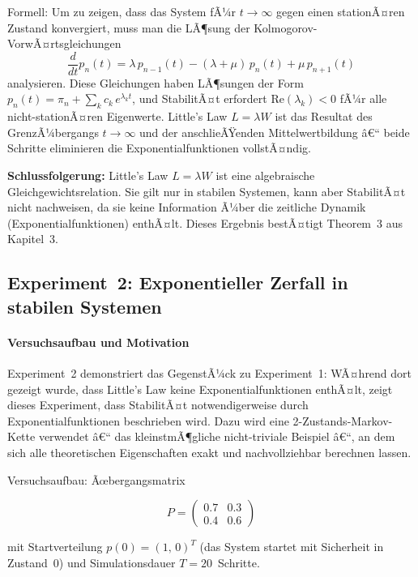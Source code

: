 ﻿\documentclass[a4paper,12pt]{report}
\theoremstyle{definition}
\begin{document}
Formell: Um zu zeigen, dass das System fÃ¼r $t \to \infty$ gegen einen
stationÃ¤ren Zustand konvergiert, muss man die LÃ¶sung der
Kolmogorov-VorwÃ¤rtsgleichungen
\[
\frac{d}{dt}p_n(t) = \lambda\, p_{n-1}(t) - (\lambda+\mu)\,p_n(t)
+ \mu\, p_{n+1}(t)
\]
analysieren.  Diese Gleichungen haben LÃ¶sungen der Form
$p_n(t) = \pi_n + \sum_k c_k\, e^{\lambda_k t}$, und StabilitÃ¤t
erfordert $\text{Re}(\lambda_k) < 0$ fÃ¼r alle nicht-stationÃ¤ren
Eigenwerte.  Little's Law $L = \lambda W$ ist das Resultat des
GrenzÃ¼bergangs $t \to \infty$ und der anschlieÃŸenden
Mittelwertbildung â€“ beide Schritte eliminieren die
Exponentialfunktionen vollstÃ¤ndig.

\textbf{Schlussfolgerung:} Little's Law $L = \lambda W$ ist eine
algebraische Gleichgewichtsrelation.  Sie gilt nur in stabilen
Systemen, kann aber StabilitÃ¤t nicht nachweisen, da sie keine
Information Ã¼ber die zeitliche Dynamik (Exponentialfunktionen)
enthÃ¤lt.  Dieses Ergebnis bestÃ¤tigt Theorem~3 aus Kapitel~3.

\subsection{Experiment~2: Exponentieller Zerfall in stabilen Systemen}
\label{subsubsec:exp2}

\paragraph{Versuchsaufbau und Motivation}

Experiment~2 demonstriert das GegenstÃ¼ck zu Experiment~1: WÃ¤hrend
dort gezeigt wurde, dass Little's Law keine Exponentialfunktionen
enthÃ¤lt, zeigt dieses Experiment, dass StabilitÃ¤t notwendigerweise
durch Exponentialfunktionen beschrieben wird.  Dazu wird eine
2-Zustands-Markov-Kette verwendet â€“ das kleinstmÃ¶gliche nicht-triviale
Beispiel â€“, an dem sich alle theoretischen Eigenschaften exakt und
nachvollziehbar berechnen lassen.

Versuchsaufbau: Ãœbergangsmatrix

\begin{equation}
	P = \begin{pmatrix} 0.7 & 0.3 \\ 0.4 & 0.6 \end{pmatrix}
\end{equation}

mit Startverteilung $p(0) = (1,\, 0)^T$ (das System startet mit
Sicherheit in Zustand~0) und Simulationsdauer $T = 20$~Schritte.
\end{document}
